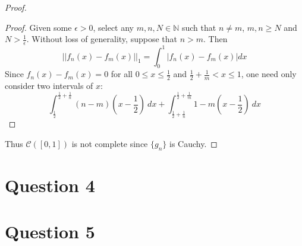 \documentclass[12pt, letterpaper]{article}
\begin{document}
\begin{proof}
\begin{proof}
    Given some $\epsilon > 0$, select any $m, n, N \in \mathbb{N}$ such that $n \neq m$, $m, n \geq N$ and $N > \frac{1}{\epsilon}$. Without loss of generality, suppose that $n > m$. Then
    $$ ||f_n(x) - f_m(x)||_1 = \int_0^1 |f_n(x) - f_m(x)| dx$$
    Since $f_n(x) - f_m(x) = 0$ for all $0 \leq x \leq \frac{1}{2}$ and $\frac{1}{2} + \frac{1}{m} < x \leq 1$, one need only consider two intervals of $x$:
    $$ \int_\frac{1}{2}^{\frac{1}{2} + \frac{1}{n}} (n-m)(x-\frac{1}{2}) \ dx + \int_{\frac{1}{2} + \frac{1}{n}}^{\frac{1}{2} + \frac{1}{m}} 1 - m(x - \frac{1}{2}) \ dx$$ 
  \end{proof}
  \noindent Thus $\mathcal{C}([0,1])$ is not complete since $\{g_n\}$ is Cauchy.
\end{proof}
\section*{Question 4}
\section*{Question 5}
\end{document}
